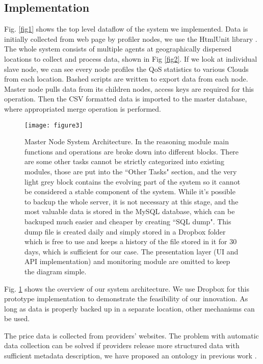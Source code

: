 \documentclass[journal]{IEEEtran}
\begin{document}
\subsection{Implementation}
Fig. \ref{fig1} shows the top level dataflow of the system we implemented. Data is initially collected from web page by profiler nodes, we use the HtmlUnit library \cite{htmlunit}. The whole system consists of multiple agents at geographically dispersed locations to collect and process data, shown in Fig \ref{fig2}. If we look at individual slave node, we can see every node profiles the QoS statistics to various Clouds from each location. Bashed scripts are written to export data from each node. Master node pulls data from its children nodes, access keys are required for this operation. Then the CSV formatted data is imported to the master database, where appropriated merge operation is performed.

\begin{figure}[!h]
 \centering
 \texttt{[image: figure3]}
 \caption{Master Node System Architecture. In the reasoning module main functions and operations are broke down into different blocks. There are some other tasks cannot be strictly categorized into existing modules, those are put into the ``Other Tasks" section, and the very light grey block contains the evolving part of the system so it cannot be considered a stable component of the system. While it’s possible to backup the whole server, it is not necessary at this stage, and the most valuable data is stored in the MySQL database, which can be backuped much easier and cheaper by creating ``SQL dump". This dump file is created daily and simply stored in a Dropbox folder which is free to use and keeps a history of the file stored in it for 30 days, which is sufficient for our case. The presentation layer (UI and API implementation) and monitoring module are omitted to keep the diagram simple.}
\label{fig3}
\end{figure}

Fig. \ref{fig3} shows the overview of our system architecture. We use Dropbox for this prototype implementation to demonstrate the feasibility of our innovation. As long as data is properly backed up in a separate location, other mechanisms can be used.

The price data is collected from providers' websites. The problem with automatic data collection can be solved if providers release more structured data with sufficient metadata description, we have proposed an ontology in previous work \cite{zhang2012ontology}.
\end{document}
